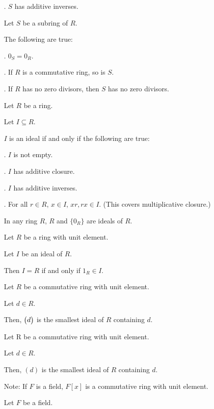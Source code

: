 \documentclass{article}
\begin{document}
    \indent{}. $S$ has additive inverses.
    

Let $S$ be a subring of $R$.

The following are true:

\indent{}. $0_S=0_R$.

\indent{}. If $R$ is a commutative ring, so is $S$.

\indent{}. If $R$ has no zero divisors, then $S$ has no zero divisors.


Let $R$ be a ring.

Let $I\subseteq R$.

$I$ is an ideal if and only if the following are true:

\indent{}. $I$ is not empty.

\indent{}. $I$ has additive closure.

\indent{}. $I$ has additive inverses.

\indent{}. For all $r\in R$, $x\in I$, $xr,rx\in I$. (This covers multiplicative closure.)


In any ring $R$, $R$ and $\{0_R\}$ are ideals of $R$.


Let $R$ be a ring with unit element.

Let $I$ be an ideal of $R$.

Then $I=R$ if and only if $1_R\in I$.


Let $R$ be a commutative ring with unit element.

Let $d\in R$.

Then, $\big{(}d\big{)}$ is the smallest ideal of $R$ containing $d$.


Let R be a commutative ring with unit element.

Let $d\in R$.

Then, $(d)$ is the smallest ideal of $R$ containing $d$.

Note: If $F$ is a field, $F[x]$ is a commutative ring with unit element.


Let $F$ be a field.
\end{document}
